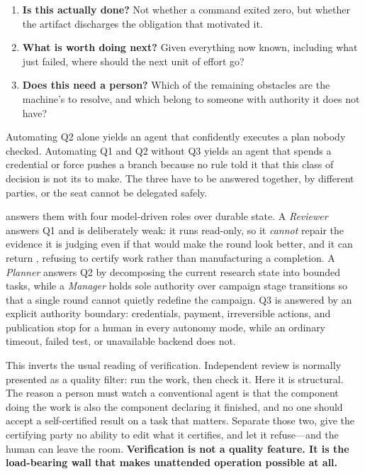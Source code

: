 \begin{enumerate}[label=\textbf{Q\arabic*.}]
  \item \textbf{Is this actually done?} Not whether a command exited zero, but
    whether the artifact discharges the obligation that motivated it.
  \item \textbf{What is worth doing next?} Given everything now known, including
    what just failed, where should the next unit of effort go?
  \item \textbf{Does this need a person?} Which of the remaining obstacles are the
    machine's to resolve, and which belong to someone with authority it does not
    have?
\end{enumerate}

Automating Q2 alone yields an agent that confidently executes a plan nobody checked.
Automating Q1 and Q2 without Q3 yields an agent that spends a credential or force
pushes a branch because no rule told it that this class of decision is not its to
make. The three have to be answered together, by different parties, or the seat
cannot be delegated safely.

\systemname answers them with four model-driven roles over durable state. A
\emph{Reviewer} answers Q1 and is deliberately weak: it runs read-only, so it
\emph{cannot} repair the evidence it is judging even if that would make the round
look better, and it can return , refusing to certify work rather than
manufacturing a completion. A \emph{Planner} answers Q2 by decomposing the current
research state into bounded tasks, while a \emph{Manager} holds sole authority over
campaign stage transitions so that a single round cannot quietly redefine the
campaign. Q3 is answered by an explicit authority boundary: credentials, payment,
irreversible actions, and publication stop for a human in every autonomy mode, while
an ordinary timeout, failed test, or unavailable backend does not.

This inverts the usual reading of verification. Independent review is normally
presented as a quality filter: run the work, then check it. Here it is structural.
The reason a person must watch a conventional agent is that the component doing the
work is also the component declaring it finished, and no one should accept a
self-certified result on a task that matters. Separate those two, give the certifying
party no ability to edit what it certifies, and let it refuse---and the human can
leave the room. \textbf{Verification is not a quality feature. It is the load-bearing
wall that makes unattended operation possible at all.}

